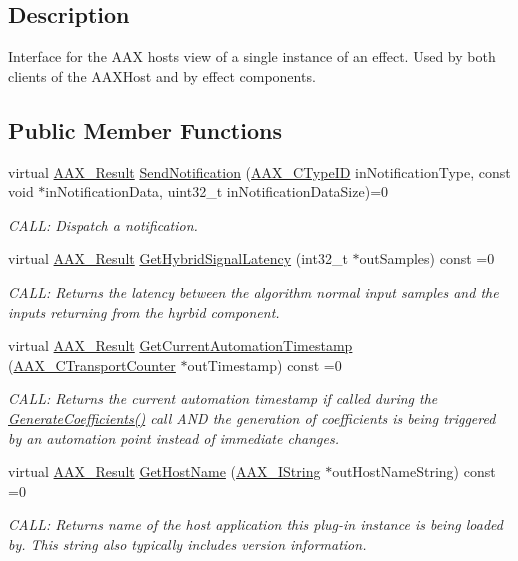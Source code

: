 \subsection{Description}
Interface for the A\+A\+X host\textquotesingle{}s view of a single instance of an effect. Used by both clients of the A\+A\+X\+Host and by effect components. 

\subsection*{Public Member Functions}
\begin{DoxyCompactItemize}
\item 
virtual \hyperlink{a00149_a4d8f69a697df7f70c3a8e9b8ee130d2f}{A\+A\+X\+\_\+\+Result} \hyperlink{a00054_a83640488e70f990fcfeeeb400b80776b}{Send\+Notification} (\hyperlink{a00149_ac678f9c1fbcc26315d209f71a147a175}{A\+A\+X\+\_\+\+C\+Type\+I\+D} in\+Notification\+Type, const void $\ast$in\+Notification\+Data, uint32\+\_\+t in\+Notification\+Data\+Size)=0
\begin{DoxyCompactList}\small\item\em C\+A\+L\+L\+: Dispatch a notification. \end{DoxyCompactList}\item 
virtual \hyperlink{a00149_a4d8f69a697df7f70c3a8e9b8ee130d2f}{A\+A\+X\+\_\+\+Result} \hyperlink{a00054_afe1844d38559c2e7f8b35a23219407e6}{Get\+Hybrid\+Signal\+Latency} (int32\+\_\+t $\ast$out\+Samples) const =0
\begin{DoxyCompactList}\small\item\em C\+A\+L\+L\+: Returns the latency between the algorithm normal input samples and the inputs returning from the hyrbid component. \end{DoxyCompactList}\item 
virtual \hyperlink{a00149_a4d8f69a697df7f70c3a8e9b8ee130d2f}{A\+A\+X\+\_\+\+Result} \hyperlink{a00054_a0a3bdcf203a721bed5d772b125052ec3}{Get\+Current\+Automation\+Timestamp} (\hyperlink{a00149_ac09cd6857748cc296ac0f8bcc20dc74b}{A\+A\+X\+\_\+\+C\+Transport\+Counter} $\ast$out\+Timestamp) const =0
\begin{DoxyCompactList}\small\item\em C\+A\+L\+L\+: Returns the current automation timestamp if called during the \hyperlink{a00061_a083265b008921b6114ede387711694b7}{Generate\+Coefficients()} call A\+N\+D the generation of coefficients is being triggered by an automation point instead of immediate changes. \end{DoxyCompactList}\item 
virtual \hyperlink{a00149_a4d8f69a697df7f70c3a8e9b8ee130d2f}{A\+A\+X\+\_\+\+Result} \hyperlink{a00054_aeac17aa11caa18994fb891109681d0d6}{Get\+Host\+Name} (\hyperlink{a00113}{A\+A\+X\+\_\+\+I\+String} $\ast$out\+Host\+Name\+String) const =0
\begin{DoxyCompactList}\small\item\em C\+A\+L\+L\+: Returns name of the host application this plug-\/in instance is being loaded by. This string also typically includes version information. \end{DoxyCompactList}\end{DoxyCompactItemize}


